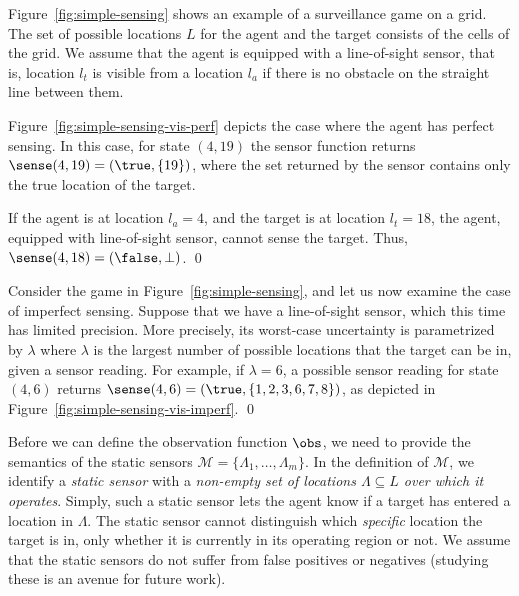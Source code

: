 \bigskip
\begin{eg}\label{ex:simple-surveillance-game-perfect-sensing}
Figure~\ref{fig:simple-sensing} shows an example of a surveillance game on a grid.  The set of possible locations $L$ for the agent and the target consists of the cells of the  grid. We assume that the agent is equipped with a line-of-sight sensor, that is, location $l_t$ is visible from a location $l_a$ if there is no obstacle on the straight line between them.

Figure~\ref{fig:simple-sensing-vis-perf} depicts the case where the agent has perfect sensing. In this case, for state $(4,19)$ the sensor function returns $\sense(4,19) = (\true,\{19\})$, where the set returned by the sensor contains only the true location of the target. 

If the agent is at location $l_a = 4$, and the target is at location $l_t = 18$, the agent, equipped with line-of-sight sensor, cannot sense the target.
Thus, $\sense(4,18) = (\false,\bot)$.
\qed
\end{eg}

\bigskip
\begin{eg}\label{ex:simple-surveillance-game-imperfect-sensing}
Consider the game in Figure~\ref{fig:simple-sensing}, and let us now examine the case of imperfect sensing. Suppose that we have a line-of-sight sensor, which this time has limited precision. More precisely, its worst-case uncertainty is parametrized by $\lambda$ where $\lambda$ is the largest number of possible locations that the target can be in, given a sensor reading. For example, if $\lambda = 6$, a possible sensor reading for state $(4,6)$ returns $\sense(4,6) = (\true, \{1,2,3,6,7,8\})$, as depicted in Figure~\ref{fig:simple-sensing-vis-imperf}. 
\qed
\end{eg}

\bigskip

Before we can define the observation function $\obs$, we need to provide the semantics of the static sensors $\mathcal{M} = \{\Lambda_1,\dots,\Lambda_m\}$. In the definition of $\mathcal M$, we identify a \emph{static sensor} with a \emph{non-empty set of locations $\Lambda \subseteq L$ over which it operates}. Simply, such a static sensor lets the agent know if a target has entered a location in $\Lambda$. The static sensor cannot distinguish which \emph{specific} location the target is in, only whether it is currently in its operating region or not. 
We assume that the static sensors do not suffer from false positives or negatives (studying these is an avenue for future work). 

